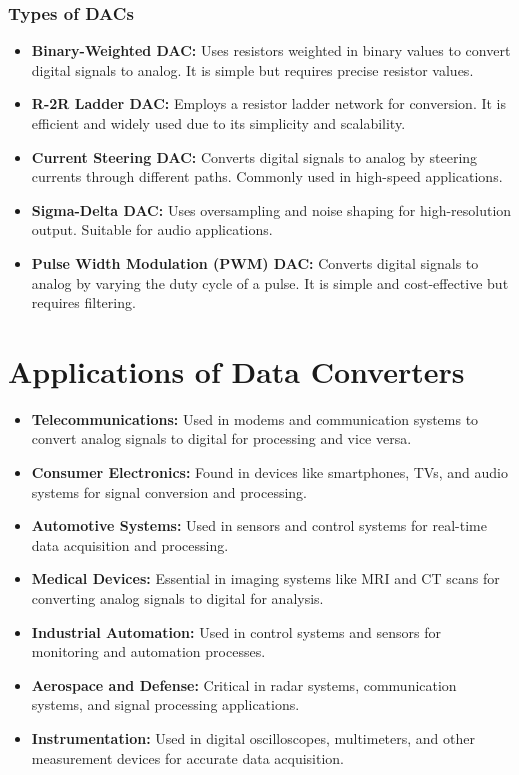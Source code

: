 \subsubsection{Types of DACs}
\begin{itemize}
    \item \textbf{Binary-Weighted DAC:} Uses resistors weighted in binary values to convert digital signals to analog. It is simple but requires precise resistor values.
    \item \textbf{R-2R Ladder DAC:} Employs a resistor ladder network for conversion. It is efficient and widely used due to its simplicity and scalability.
    \item \textbf{Current Steering DAC:} Converts digital signals to analog by steering currents through different paths. Commonly used in high-speed applications.
    \item \textbf{Sigma-Delta DAC:} Uses oversampling and noise shaping for high-resolution output. Suitable for audio applications.
    \item \textbf{Pulse Width Modulation (PWM) DAC:} Converts digital signals to analog by varying the duty cycle of a pulse. It is simple and cost-effective but requires filtering.
\end{itemize}

\section{Applications of Data Converters}
\begin{itemize}
    \item \textbf{Telecommunications:} Used in modems and communication systems to convert analog signals to digital for processing and vice versa.
    \item \textbf{Consumer Electronics:} Found in devices like smartphones, TVs, and audio systems for signal conversion and processing.
    \item \textbf{Automotive Systems:} Used in sensors and control systems for real-time data acquisition and processing.
    \item \textbf{Medical Devices:} Essential in imaging systems like MRI and CT scans for converting analog signals to digital for analysis.
    \item \textbf{Industrial Automation:} Used in control systems and sensors for monitoring and automation processes.
    \item \textbf{Aerospace and Defense:} Critical in radar systems, communication systems, and signal processing applications.
    \item \textbf{Instrumentation:} Used in digital oscilloscopes, multimeters, and other measurement devices for accurate data acquisition.
\end{itemize}

